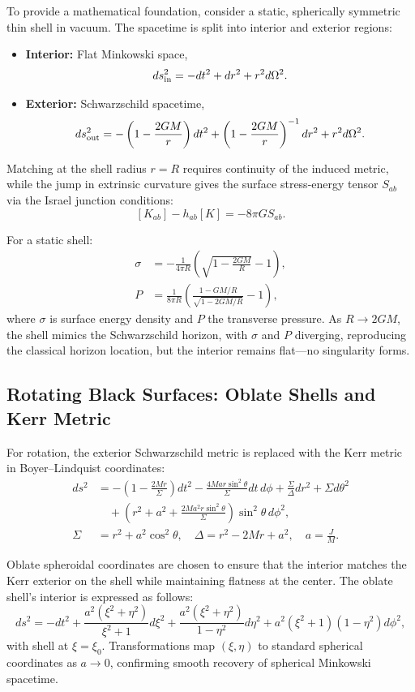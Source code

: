 \documentclass[12pt]{article}
\begin{document}
To provide a mathematical foundation, consider a static, spherically symmetric thin shell in vacuum. The spacetime is split into interior and exterior regions:
\begin{itemize}
    \item \textbf{Interior:} Flat Minkowski space,
    \[ 
    ds^2_{\rm in} = -dt^2 + dr^2 + r^2 d\Omega^2.
    \]
    \item \textbf{Exterior:} Schwarzschild spacetime,
    \[
    ds^2_{\rm out} = -\left(1 - \frac{2GM}{r}\right) dt^2 + \left(1 - \frac{2GM}{r}\right)^{-1} dr^2 + r^2 d\Omega^2.
    \]
\end{itemize}

Matching at the shell radius \(r=R\) requires continuity of the induced metric, while the jump in extrinsic curvature gives the surface stress-energy tensor \(S_{ab}\) via the Israel junction conditions:
\[
[K_{ab}] - h_{ab}[K] = -8\pi G S_{ab}.
\]

For a static shell:
\begin{align*}
\sigma &= -\frac{1}{4\pi R} \left( \sqrt{1 - \frac{2GM}{R}} - 1 \right),\\
P &= \frac{1}{8\pi R} \left( \frac{1 - GM/R}{\sqrt{1 - 2GM/R}} - 1 \right),
\end{align*}
where \(\sigma\) is surface energy density and \(P\) the transverse pressure. As \(R \to 2GM\),  the shell mimics the Schwarzschild horizon, with \(\sigma\) and \(P\) diverging, reproducing the classical horizon location, but the interior remains flat---no singularity forms.

\subsection{Rotating Black Surfaces: Oblate Shells and Kerr Metric}

For rotation, the exterior Schwarzschild metric is replaced with the Kerr metric in Boyer--Lindquist coordinates:
\begin{align*}
ds^2 &= -\left(1 - \frac{2Mr}{\Sigma}\right) dt^2 - \frac{4Mar\sin^2\theta}{\Sigma} dt\, d\phi + \frac{\Sigma}{\Delta} dr^2 + \Sigma d\theta^2 \\
&\quad + \left(r^2 + a^2 + \frac{2Ma^2 r \sin^2\theta}{\Sigma} \right) \sin^2\theta\, d\phi^2,\\
\Sigma &= r^2 + a^2 \cos^2\theta, \quad \Delta = r^2 - 2Mr + a^2, \quad a = \frac{J}{M}.
\end{align*}

Oblate spheroidal coordinates are chosen to ensure that the interior matches the Kerr exterior on the shell while maintaining flatness at the center.  The oblate shell's interior is expressed as follows:
\[
ds^2 = -dt^2 + \frac{a^2(\xi^2 + \eta^2)}{\xi^2 + 1} d\xi^2 + \frac{a^2(\xi^2 + \eta^2)}{1 - \eta^2} d\eta^2 + a^2 (\xi^2 + 1)(1 - \eta^2) d\phi^2,
\]
with shell at \(\xi = \xi_0\). Transformations map \((\xi,\eta)\) to standard spherical coordinates as \(a \to 0\), confirming smooth recovery of spherical Minkowski spacetime.
\end{document}
